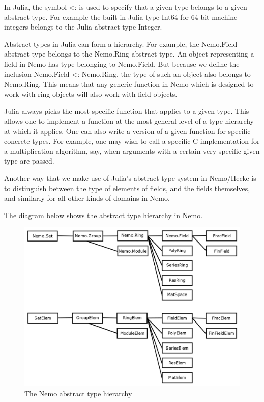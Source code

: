 \documentclass{sig-alternate-05-2015}
\begin{document}
In Julia, the symbol <: is used to specify that a given type belongs to a given abstract type.
For example the built-in Julia type Int64 for 64 bit machine integers belongs to the Julia
abstract type Integer.

Abstract types in Julia can form a hierarchy. For example, the Nemo.Field abstract type belongs
to the Nemo.Ring abstract type. An object representing a field in Nemo has type belonging to
Nemo.Field. But because we define the inclusion Nemo.Field <: Nemo.Ring, the type of such an
object also belongs to Nemo.Ring. This means that any generic function in Nemo which is designed
to work with ring objects will also work with field objects.

Julia always picks the most specific function that applies to a given type. This allows one to
implement a function at the most general level of a type hierarchy at which it applies. One can
also write a version of a given function for specific concrete types. For example, one may wish
to call a specific C implementation for a multiplication algorithm, say, when arguments with a
certain very specific given type are passed.

Another way that we make use of Julia's abstract type system in Nemo/Hecke is to distinguish
between the type of elements of fields, and the fields themselves, and similarly for all other
kinds of domains in Nemo. 

The diagram below shows the abstract type hierarchy in Nemo.

\begin{figure}[h]
\centering
\includegraphics[scale=0.21]{types.png}
\caption{The Nemo abstract type hierarchy}
\end{figure}
\end{document}
